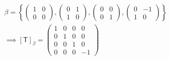 \begin{enumerate}
\begin{itemize}
\end{itemize}
\begin{gather}
\beta = \left\{\begin{pmatrix}1 & 0\\0 &
    0\end{pmatrix},\begin{pmatrix}0 & 1\\1
    &0\end{pmatrix},\begin{pmatrix}0 & 0 \\0 &
    1\end{pmatrix},\begin{pmatrix}0 & -1 \\1 &
    0\end{pmatrix}\right\}\\
\implies [\mathsf{T}]_\beta =
\begin{pmatrix}
1 & 0 & 0 & 0\\
0 &1 & 0 & 0\\
0 & 0 & 1 & 0\\
0 & 0 & 0 & -1
\end{pmatrix}
\end{gather}
\end{enumerate}
